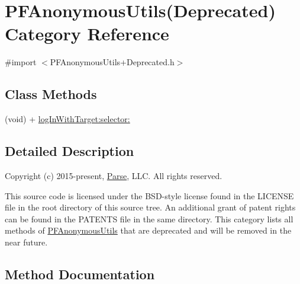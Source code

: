 \hypertarget{category_p_f_anonymous_utils_07_deprecated_08}{}\section{P\+F\+Anonymous\+Utils(Deprecated) Category Reference}
\label{category_p_f_anonymous_utils_07_deprecated_08}


{\ttfamily \#import $<$P\+F\+Anonymous\+Utils+\+Deprecated.\+h$>$}

\subsection*{Class Methods}
\begin{DoxyCompactItemize}
\item 
(void) + \hyperlink{category_p_f_anonymous_utils_07_deprecated_08_adb7100f944decabec118d86332ca1312}{log\+In\+With\+Target\+:selector\+:}
\begin{DoxyCompactList}\small\item\em 

 \end{DoxyCompactList}\end{DoxyCompactItemize}


\subsection{Detailed Description}
Copyright (c) 2015-\/present, \hyperlink{interface_parse}{Parse}, L\+L\+C. All rights reserved.

This source code is licensed under the B\+S\+D-\/style license found in the L\+I\+C\+E\+N\+S\+E file in the root directory of this source tree. An additional grant of patent rights can be found in the P\+A\+T\+E\+N\+T\+S file in the same directory. This category lists all methods of {\ttfamily \hyperlink{interface_p_f_anonymous_utils}{P\+F\+Anonymous\+Utils}} that are deprecated and will be removed in the near future. 

\subsection{Method Documentation}
\hypertarget{category_p_f_anonymous_utils_07_deprecated_08_adb7100f944decabec118d86332ca1312}{}
